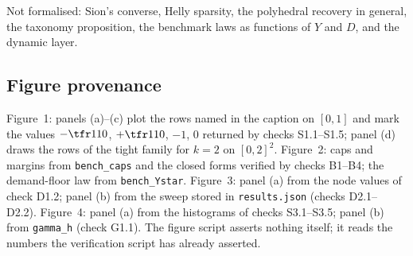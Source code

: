 Not formalised: Sion's converse, Helly sparsity, the polyhedral recovery in general, the taxonomy proposition, the benchmark laws as functions of $Y$ and $D$, and the dynamic layer.

\subsection{Figure provenance}
Figure~1: panels (a)--(c) plot the rows named in the caption on $[0,1]$ and mark the values $-\tfr1{10}$, $+\tfr1{10}$, $-1$, $0$ returned by checks S1.1--S1.5; panel (d) draws the rows of the tight family for $k=2$ on $[0,2]^2$. Figure~2: caps and margins from \texttt{bench\_caps} and the closed forms verified by checks B1--B4; the demand-floor law from \texttt{bench\_Ystar}. Figure~3: panel (a) from the node values of check D1.2; panel (b) from the sweep stored in \texttt{results.json} (checks D2.1--D2.2). Figure~4: panel (a) from the histograms of checks S3.1--S3.5; panel (b) from \texttt{gamma\_h} (check G1.1). The figure script asserts nothing itself; it reads the numbers the verification script has already asserted.
